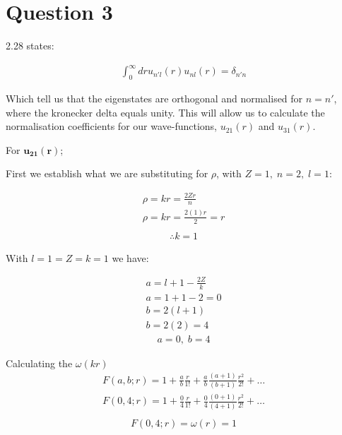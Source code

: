 \documentclass{article}
\begin{document}
\section{Question 3}

    2.28 states:

    \begin{gather}
        \int_{0}^{\infty}dr u_{n'l}(r) u_{nl}(r) = \delta_{n'n}
    \end{gather}
    
    Which tell us that the eigenstates are orthogonal and normalised for $n=n'$, where the kronecker delta equals unity.
    This will allow us to calculate the normalisation coefficients for our wave-functions, $u_{21}(r)$ and $u_{31}(r)$.\medskip

    For $\mathbf{u_{21}(r)}$;\smallskip

    First we establish what we are substituting for $\rho$, with $Z=1,\; n=2, \; l=1$:

    \begin{gather*}
        \rho = kr = \frac{2Zr}{n}\\
        \rho = kr = \frac{2(1)r}{2} = r\\
    \end{gather*}\vspace{-1.5cm}
    \begin{gather}
        \therefore k = 1
    \end{gather}
    

    With $l=1=Z=k=1$ we have:
    
    \begin{gather*} 
             a = l + 1 - \frac{2Z}{k}\\
             a = 1 + 1 - 2 = 0\\
             b = 2(l+1)\\
             b= 2(2) = 4
    \end{gather*}\vspace{-1.5cm}
    \begin{gather}
        a = 0, \; b= 4
    \end{gather}

    
    Calculating the $\omega(kr)$
    \begin{gather*}
        F(a,b;r) = 1 + \frac{a}{b}\frac{r}{1!} + \frac{a}{b}\frac{(a+1)}{(b+1)}\frac{r^2}{2!} + \dots\\
        F(0,4;r) = 1 + \frac{0}{4}\frac{r}{1!} + \frac{0}{4}\frac{(0+1)}{(4+1)}\frac{r^2}{2!} + \dots\\
    \end{gather*}\vspace{-1.5cm}
    \begin{gather}
        F(0,4;r) = \omega(r)=1 
    \end{gather}
\end{document}
